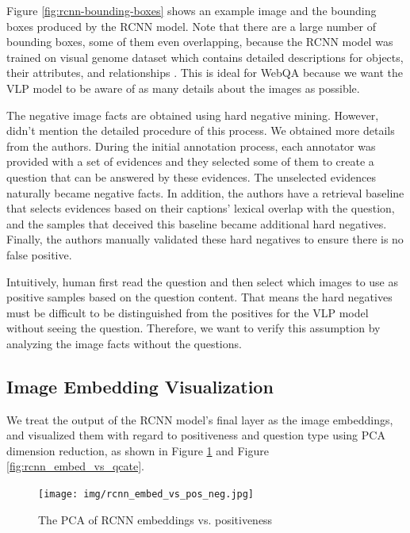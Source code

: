 \documentclass[nohyperref]{article}
\theoremstyle{plain}
\theoremstyle{definition}
\theoremstyle{remark}
\begin{document}
    Figure \ref{fig:rcnn-bounding-boxes} shows an example image and the bounding boxes produced by the RCNN model.
    Note that there are a large number of bounding boxes, some of them even overlapping, because
    the RCNN model was trained on visual genome dataset which contains detailed descriptions for objects, their
    attributes, and relationships \cite{visualgenome}.
    This is ideal for WebQA because we want the VLP model to be aware of as many details about the images as possible.

    The negative image facts are obtained using hard negative mining.
    However, \cite{webqa} didn't mention the detailed procedure of this process.
    We obtained more details from the authors.
    During the initial annotation process, each annotator was provided with a set of evidences and
    they selected some of them to create a question that can be answered by these evidences.
    The unselected evidences naturally became negative facts.
    In addition, the authors have a retrieval baseline that selects evidences based on their captions' lexical overlap
    with the question, and the samples that deceived this baseline became additional hard negatives.
    Finally, the authors manually validated these hard negatives to ensure there is no false positive.

    Intuitively, human first read the question and then select which images to use as positive samples based on the
    question content.
    That means the hard negatives must be difficult to be distinguished from the positives for the VLP model
    without seeing the question.
    Therefore, we want to verify this assumption by analyzing the image facts without the questions.

    \subsection{Image Embedding Visualization}

    We treat the output of the RCNN model's final layer as the image embeddings, and visualized them with regard to
    positiveness and question type using PCA dimension reduction, as shown in Figure \ref{fig:rcnn_embed_vs_pos_neg} and
    Figure \ref{fig:rcnn_embed_vs_qcate}.

    \begin{figure}[h]
        \center
        \texttt{[image: img/rcnn\_embed\_vs\_pos\_neg.jpg]}
        \caption{The PCA of RCNN embeddings vs. positiveness}
        \label{fig:rcnn_embed_vs_pos_neg}
    \end{figure}
\end{document}
